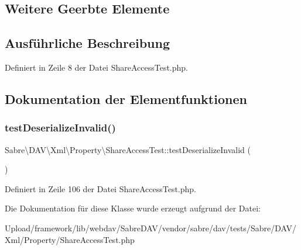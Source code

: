 \subsection*{Weitere Geerbte Elemente}


\subsection{Ausführliche Beschreibung}


Definiert in Zeile 8 der Datei Share\+Access\+Test.\+php.



\subsection{Dokumentation der Elementfunktionen}
\mbox{\label{class_sabre_1_1_d_a_v_1_1_xml_1_1_property_1_1_share_access_test_a72ce4fafcb23e004751e8ccc38686df4}} 
\subsubsection{\texorpdfstring{test\+Deserialize\+Invalid()}{testDeserializeInvalid()}}
{\footnotesize\ttfamily Sabre\textbackslash{}\+D\+A\+V\textbackslash{}\+Xml\textbackslash{}\+Property\textbackslash{}\+Share\+Access\+Test\+::test\+Deserialize\+Invalid (\begin{DoxyParamCaption}{ }\end{DoxyParamCaption})}



Definiert in Zeile 106 der Datei Share\+Access\+Test.\+php.



Die Dokumentation für diese Klasse wurde erzeugt aufgrund der Datei\+:\begin{DoxyCompactItemize}
\item 
Upload/framework/lib/webdav/\+Sabre\+D\+A\+V/vendor/sabre/dav/tests/\+Sabre/\+D\+A\+V/\+Xml/\+Property/Share\+Access\+Test.\+php\end{DoxyCompactItemize}
